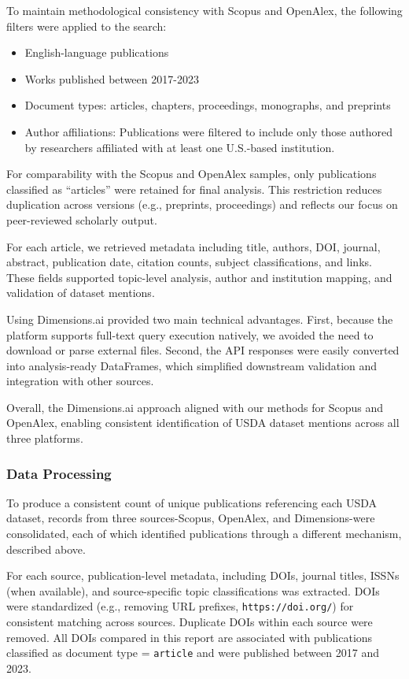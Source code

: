 \documentclass[
  letterpaper,
  DIV=11,
  numbers=noendperiod]{scrartcl}
\providecommand{\tightlist}{%
  \setlength{\itemsep}{0pt}\setlength{\parskip}{0pt}}\usepackage{longtable,booktabs,array}
\begin{document}
To maintain methodological consistency with Scopus and OpenAlex, the
following filters were applied to the search:

\begin{itemize}
\tightlist
\item
  English-language publications
\item
  Works published between 2017-2023
\item
  Document types: articles, chapters, proceedings, monographs, and
  preprints
\item
  Author affiliations: Publications were filtered to include only those
  authored by researchers affiliated with at least one U.S.-based
  institution.
\end{itemize}

For comparability with the Scopus and OpenAlex samples, only
publications classified as ``articles'' were retained for final
analysis. This restriction reduces duplication across versions (e.g.,
preprints, proceedings) and reflects our focus on peer-reviewed
scholarly output.

For each article, we retrieved metadata including title, authors, DOI,
journal, abstract, publication date, citation counts, subject
classifications, and links. These fields supported topic-level analysis,
author and institution mapping, and validation of dataset mentions.

Using Dimensions.ai provided two main technical advantages. First,
because the platform supports full-text query execution natively, we
avoided the need to download or parse external files. Second, the API
responses were easily converted into analysis-ready DataFrames, which
simplified downstream validation and integration with other sources.

Overall, the Dimensions.ai approach aligned with our methods for Scopus
and OpenAlex, enabling consistent identification of USDA dataset
mentions across all three platforms.

\subsubsection{Data Processing}\label{data-processing}

To produce a consistent count of unique publications referencing each
USDA dataset, records from three sources-Scopus, OpenAlex, and
Dimensions-were consolidated, each of which identified publications
through a different mechanism, described above.

For each source, publication-level metadata, including DOIs, journal
titles, ISSNs (when available), and source-specific topic
classifications was extracted. DOIs were standardized (e.g., removing
URL prefixes, \texttt{https://doi.org/}) for consistent matching across
sources. Duplicate DOIs within each source were removed. All DOIs
compared in this report are associated with publications classified as
document type = \texttt{article} and were published between 2017 and
2023.
\end{document}
